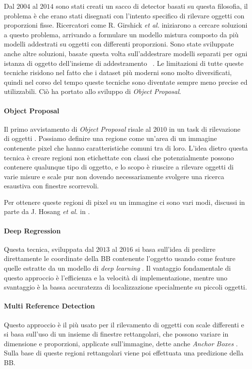 Dal $2004$ al $2014$ sono stati creati un sacco di detector basati su questa filosofia, il problema è che erano stati disegnati con l'intento specifico di rilevare oggetti con proporzioni fisse. Ricercatori come R. Girshick \textit{et al.} iniziarono a cercare soluzioni a questo problema, arrivando a formulare un modello mistura \cite{felzenszwalb2009object} composto da più modelli addestrati su oggetti con differenti proporzioni. Sono state sviluppate anche altre soluzioni, basate questa volta sull'addestrare modelli separati per ogni istanza di oggetto dell'insieme di addestramento \cite{malisiewicz2011ensemble} \cite{malisiewicz2011exemplar}. Le limitazioni di tutte queste tecniche risidono nel fatto che i dataset più moderni sono molto diversificati, quindi nel corso del tempo queste tecniche sono diventate sempre meno precise ed utilizzabili. Ciò ha portato allo sviluppo di \textit{Object Proposal}.
\paragraph{Object Proposal}
Il primo avvistamento di \textit{Object Proposal} risale al $2010$ in un task di rilevazione di oggetti \cite{alexe2010object}.
Possiamo definire una regione come un'area di un immagine contenente pixel che hanno caratteristiche comuni tra di loro. L'idea dietro questa tecnica è creare regioni non etichettate con classi che potenzialmente possono contenere qualunque tipo di oggetto, e lo scopo è riuscire a rilevare oggetti di varie misure e scale pur non dovendo necessariamente svolgere una ricerca esaustiva con finestre scorrevoli.

Per ottenere queste regioni di pixel su un immagine ci sono vari modi, discussi in parte da J. Hosang \textit{et al.} in \cite{hosang2015makes}.
\paragraph{Deep Regression}
Questa tecnica, sviluppata dal $2013$ al $2016$ si basa sull'idea di predirre direttamente le coordinate della \ac{BB} contenente l'oggetto usando come feature quelle estratte da un modello di \textit{deep learning} \cite{redmon2016you}. Il vantaggio fondamentale di questo approccio è l'efficienza e la velocità di implementazione, mentre uno svantaggio è la bassa accuratezza di localizzazione specialmente su piccoli oggetti.
\paragraph{Multi Reference Detection}
Questo approccio è il più usato per il rilevamento di oggetti con scale differenti e si basa sull'uso di un insieme di finestre rettangolari, che possono variare in dimensione e proporzioni, applicate sull'immagine, dette anche \textit{Anchor Boxes} \cite{ren2015faster, liu2016ssd, redmon2017yolo9000}. Sulla base di queste regioni rettangolari viene poi effettuata una predizione della \ac{BB}. 
